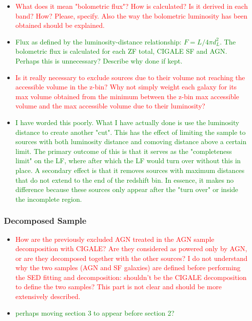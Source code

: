 \begin{itemize}
    \item \textcolor{red}{What does it mean "bolometric flux"? How is calculated? Is it derived in each band? How? Please, specify. Also the way the bolometric luminosity has been obtained should be explained.}
    \item \textcolor{Green}{Flux as defined by the luminosity-distance relationship: $F=L/4\pi d^2_L$. The bolometric flux is calculated for each ZF total, CIGALE SF and AGN. Perhaps this is unnecessary? Describe why done if kept.}
    \vspace{0.25cm}
    
    \item \textcolor{red}{Is it really necessary to exclude sources due to their volume not reaching the accessible volume in the z-bin? Why not simply weight each galaxy for its max volume obtained from the minimum between the z-bin max accessible volume and the max accessible volume due to their luminosity?}
    \item \textcolor{Green}{I have worded this poorly. What I have actually done is use the luminosity distance to create another "cut". This has the effect of limiting the sample to sources with both luminosity distance and comoving distance above a certain limit. The primary outcome of this is that it serves as the "completeness limit"  on the LF, where after which the LF would turn over without this in place. A secondary effect is that it removes sources with maximum distances that do not extend to the end of the redshift bin. In essence, it makes no difference because these sources only appear after the "turn over" or inside the incomplete region.}
    \vspace{0.25cm}
\end{itemize}

\subsubsection{Decomposed Sample} \label{Sec: Decomposed AGN Selection}

\begin{itemize}
    \item \textcolor{red}{How are the previously excluded AGN treated in the AGN sample decomposition with CIGALE? Are they considered as powered only by AGN, or are they decomposed together with the other sources? I do not understand why the two samples (AGN and SF galaxies) are defined before performing the SED fitting and decomposition: shouldn't be the CIGALE decomposition to define the two samples? This part is not clear and should be more extensively described.}
    \item \textcolor{Green}{perhaps moving section 3 to appear before section 2?}
\end{itemize}

